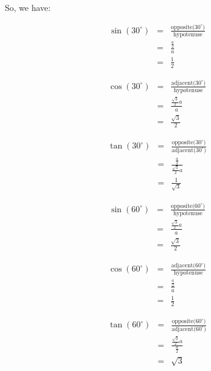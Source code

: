 So, we have:

\begin{minipage}{0.4\textwidth}
\begin{eqnarray*}
\sin(30^\circ)&=&\frac{\mbox{opposite($30^\circ$)}}{\mbox{hypotenuse}}\\
&=&\frac{\frac{a}{2}}{a}\\
&=&\frac{1}{2}
\end{eqnarray*}

\begin{eqnarray*}
\cos(30^\circ)&=&\frac{\mbox{adjacent($30^\circ$)}}{\mbox{hypotenuse}}\\
&=&\frac{\frac{\sqrt{3}}{2}a}{a}\\
&=&\frac{\sqrt{3}}{2}
\end{eqnarray*}

\begin{eqnarray*}
\tan(30^\circ)&=&\frac{\mbox{opposite($30^\circ$)}}{\mbox{adjacent($30^\circ$)}}\\
&=&\frac{\frac{a}{2}}{\frac{\sqrt{3}}{2}a}\\
&=&\frac{1}{\sqrt{3}}
\end{eqnarray*}

\end{minipage}
\begin{minipage}{0.4\textwidth}
\begin{eqnarray*}
\sin(60^\circ)&=&\frac{\mbox{opposite($60^\circ$)}}{\mbox{hypotenuse}}\\
&=&\frac{\frac{\sqrt{3}}{2}a}{a}\\
&=&\frac{\sqrt{3}}{2}
\end{eqnarray*}

\begin{eqnarray*}
\cos(60^\circ)&=&\frac{\mbox{adjacent($60^\circ$)}}{\mbox{hypotenuse}}\\
&=&\frac{\frac{a}{2}}{a}\\
&=&\frac{1}{2}
\end{eqnarray*}

\begin{eqnarray*}
\tan(60^\circ)&=&\frac{\mbox{opposite($60^\circ$)}}{\mbox{adjacent($60^\circ$)}}\\
&=&\frac{\frac{\sqrt{3}}{2}a}{\frac{a}{2}}\\
&=&\sqrt{3}
\end{eqnarray*}

\end{minipage}

